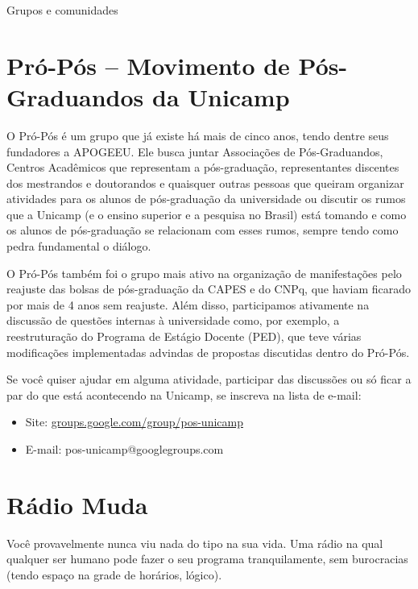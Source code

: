 
\begin{story}{Grupos e comunidades}

\section*{Pró-Pós -- Movimento de Pós-Graduandos da Unicamp}

O Pró-Pós é um grupo que já existe há mais de cinco anos, tendo dentre seus fundadores a APOGEEU. Ele busca juntar Associações de Pós-Graduandos, Centros Acadêmicos que representam a pós-graduação, representantes discentes dos mestrandos e doutorandos e quaisquer outras pessoas que queiram organizar atividades para os alunos de pós-graduação da universidade ou discutir os rumos que a Unicamp (e o ensino superior e a pesquisa no Brasil) está tomando e como os alunos de pós-graduação se relacionam com esses rumos, sempre tendo como pedra fundamental o diálogo.

O Pró-Pós também foi o grupo mais ativo na organização de manifestações pelo reajuste das bolsas de pós-graduação da CAPES e do CNPq, que haviam ficarado por mais de 4 anos sem reajuste. Além disso, participamos ativamente na discussão de questões internas à universidade como, por exemplo, a reestruturação do Programa de Estágio Docente (PED), que teve várias modificações implementadas advindas de propostas discutidas dentro do Pró-Pós.

Se você quiser ajudar em alguma atividade, participar das discussões ou só ficar a par do que está acontecendo na Unicamp, se inscreva na lista de e-mail:

\begin{itemize}
\item Site: \url{groups.google.com/group/pos-unicamp}
\item E-mail: pos-unicamp@googlegroups.com
\end{itemize}

\section*{Rádio Muda}

Você provavelmente nunca viu nada do tipo na sua vida. Uma rádio na qual qualquer ser humano pode fazer o seu programa tranquilamente, sem burocracias (tendo espaço na grade de horários, lógico).


\end{story}
